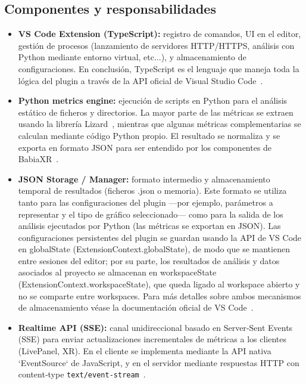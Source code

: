 \documentclass[a4paper, 12pt]{book}
\begin{document}
\subsection{Componentes y responsabilidades}
\begin{itemize}
  \item \textbf{VS Code Extension (TypeScript):} registro de comandos, UI en el editor, gestión de procesos (lanzamiento de servidores HTTP/HTTPS, análisis con Python mediante entorno virtual, etc...), y almacenamiento de configuraciones. En conclusión, TypeScript es el lenguaje que maneja toda la lógica del plugin a través de la API oficial de Visual Studio Code~\cite{vscode-api}.
  \item \textbf{Python metrics engine:} ejecución de scripts en Python para el análisis estático de ficheros y directorios. La mayor parte de las métricas se extraen usando la librería Lizard~\cite{lizard}, mientras que algunas métricas complementarias se calculan mediante código Python propio. El resultado se normaliza y se exporta en formato JSON para ser entendido por los componentes de BabiaXR~\cite{moreno2022babiaxr}.
  \item \textbf{JSON Storage / Manager:} formato intermedio y almacenamiento temporal de resultados (ficheros .json o memoria). Este formato se utiliza tanto para las configuraciones del plugin —por ejemplo, parámetros a representar y el tipo de gráfico seleccionado— como para la salida de los análisis ejecutados por Python (las métricas se exportan en JSON). Las configuraciones persistentes del plugin se guardan usando la API de VS Code en globalState (ExtensionContext.globalState), de modo que se mantienen entre sesiones del editor; por su parte, los resultados de análisis y datos asociados al proyecto se almacenan en workspaceState (ExtensionContext.workspaceState), que queda ligado al workspace abierto y no se comparte entre workspaces. Para más detalles sobre ambos mecanismos de almacenamiento véase la documentación oficial de VS Code~\cite{vscode-storage}.
  \item \textbf{Realtime API (SSE):} canal unidireccional basado en Server‑Sent Events (SSE) para enviar actualizaciones incrementales de métricas a los clientes (LivePanel, XR). En el cliente se implementa mediante la API nativa `EventSource` de JavaScript, y en el servidor mediante respuestas HTTP con content‑type \texttt{text/event-stream}~\cite{mdn-sse}. 


\end{itemize}
\end{document}
